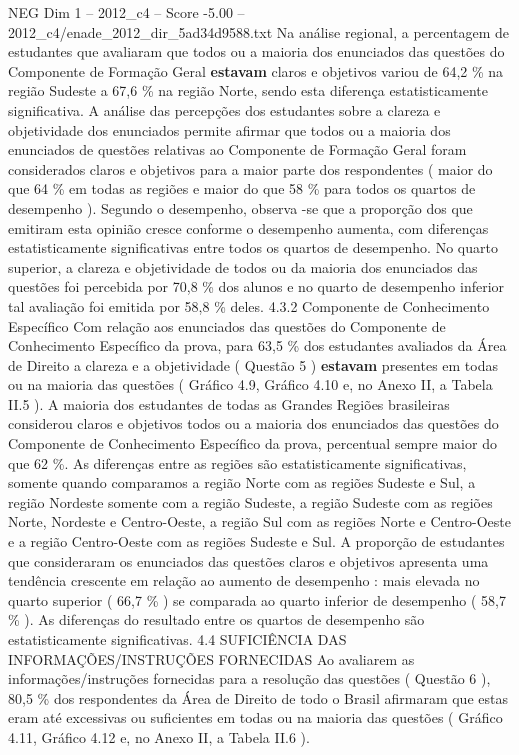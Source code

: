 \begin{textsample}{NEG Dim 1 – 2012\_c4 – Score -5.00 – 2012\_c4/enade\_2012\_dir\_5ad34d9588.txt}
Na análise regional, a percentagem de estudantes que avaliaram que todos ou a maioria dos enunciados das questões do Componente de Formação Geral \textbf{estavam} claros e objetivos variou de 64,2 \% na região Sudeste a 67,6 \% na região Norte, sendo esta diferença estatisticamente significativa.
A análise das percepções dos estudantes sobre a clareza e objetividade dos enunciados permite afirmar que todos ou a maioria dos enunciados de questões relativas ao Componente de Formação Geral foram considerados claros e objetivos para a maior parte dos respondentes ( maior do que 64 \% em todas as regiões e maior do que 58 \% para todos os quartos de desempenho ).
Segundo o desempenho, observa -se que a proporção dos que emitiram esta opinião cresce conforme o desempenho aumenta, com diferenças estatisticamente significativas entre todos os quartos de desempenho.
No quarto superior, a clareza e objetividade de todos ou da maioria dos enunciados das questões foi percebida por 70,8 \% dos alunos e no quarto de desempenho inferior tal avaliação foi emitida por 58,8 \% deles. 4.3.2 Componente de Conhecimento Específico Com relação aos enunciados das questões do Componente de Conhecimento Específico da prova, para 63,5 \% dos estudantes avaliados da Área de Direito a clareza e a objetividade ( Questão 5 ) \textbf{estavam} presentes em todas ou na maioria das questões ( Gráfico 4.9, Gráfico 4.10 e, no Anexo II, a Tabela II.5 ).
A maioria dos estudantes de todas as Grandes Regiões brasileiras considerou claros e objetivos todos ou a maioria dos enunciados das questões do Componente de Conhecimento Específico da prova, percentual sempre maior do que 62 \%.
As diferenças entre as regiões são estatisticamente significativas, somente quando comparamos a região Norte com as regiões Sudeste e Sul, a região Nordeste somente com a região Sudeste, a região Sudeste com as regiões Norte, Nordeste e Centro-Oeste, a região Sul com as regiões Norte e Centro-Oeste e a região Centro-Oeste com as regiões Sudeste e Sul.
A proporção de estudantes que consideraram os enunciados das questões claros e objetivos apresenta uma tendência crescente em relação ao aumento de desempenho : mais elevada no quarto superior ( 66,7 \% ) se comparada ao quarto inferior de desempenho ( 58,7 \% ).
As diferenças do resultado entre os quartos de desempenho são estatisticamente significativas. 4.4 SUFICIÊNCIA DAS INFORMAÇÕES/INSTRUÇÕES FORNECIDAS Ao avaliarem as informações/instruções fornecidas para a resolução das questões ( Questão 6 ), 80,5 \% dos respondentes da Área de Direito de todo o Brasil afirmaram que estas eram até excessivas ou suficientes em todas ou na maioria das questões ( Gráfico 4.11, Gráfico 4.12 e, no Anexo II, a Tabela II.6 ).

\end{textsample}
